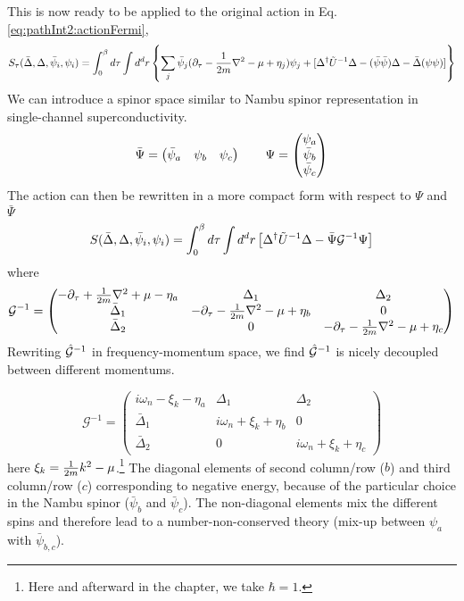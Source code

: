 This is now ready to be applied to the original action in Eq. \ref{eq:pathInt2:actionFermi}, 
\begin{equation}\label{eq:pathInt2:actionMix}
S_{\tau}(\bar\Delta,\Delta,\bar\psi_{i},\psi_{i})=\int^{\beta}_{0}d\tau\int{d^{d}r}\left\{\sum_{j}\bar\psi_{j}(\partial_\tau-\frac{1}{2m}\nabla^{2}-\mu+\eta_{j})\psi_{j}
+[\Delta^{\dagger}\tilde{U}^{-1}\Delta-(\bar\psi\bar\psi)\Delta-\bar\Delta{}(\psi\psi)]\right\}
\end{equation}
We can introduce a spinor space similar to Nambu spinor representation in single-channel superconductivity.  
\begin{equation}
\bar\Psi=\begin{pmatrix}\bar\psi_{a}&\psi_{b}&\psi_{c}\end{pmatrix}\qquad\Psi=\begin{pmatrix}\psi_{a}\\\bar\psi_{b}\\\bar\psi_{c}\end{pmatrix}
\end{equation}
The action can then be rewritten in a more compact form with respect to $\Psi$ and $\bar\Psi$
\begin{equation}\label{eq:pathInt2:actionMixCompact}
S(\bar\Delta,\Delta,\bar\psi_{i},\psi_{i})=\int^{\beta}_{0}d\tau\int{d^{d}r}
	\left[\Delta^{\dagger}\tilde{U}^{-1}\Delta-\bar\Psi\mathcal{G}^{-1}\Psi\right]
\end{equation}
where 
\begin{equation}
\mathcal{G}^{-1}=
\begin{pmatrix}\label{eq:pathInt2:nGDelta}
-\partial_{\tau}+\frac{1}{2m}\nabla^{2}+\mu-\eta_{a}&\Delta_{1}&\Delta_{2}\\
\bar\Delta_{1}&-\partial_{\tau}-\frac{1}{2m}\nabla^{2}-\mu+\eta_{b}&0\\
\bar\Delta_{2}&0&-\partial_{\tau}-\frac{1}{2m}\nabla^{2}-\mu+\eta_{c}
\end{pmatrix}
\end{equation}
Rewriting  $\hat{\mathcal{G}}^{-1}$ in frequency-momentum space, we find $\hat{\mathcal{G}}^{-1}$ is nicely decoupled between different momentums. 

\begin{equation}\label{eq:pathInt2:nGDeltaK}
\mathcal{G}^{-1}=
\begin{pmatrix}
i\omega_{n}-\xi_{k}-\eta_{a}&\Delta_{1}&\Delta_{2}\\
\bar\Delta_{1}&i\omega_{n}+\xi_{k}+\eta_{b}&0\\
\bar\Delta_{2}&0&i\omega_{n}+\xi_{k}+\eta_{c}
\end{pmatrix}
\end{equation}
here $\xi_{k}=\frac{1}{2m}k^{2}-\mu$.\footnote{Here and afterward in the chapter, we take $\hbar=1$.} The diagonal elements of second column/row (${b}$) and third column/row (${c}$) corresponding to negative energy, because of the particular choice in the Nambu spinor ($\bar\psi_{b}$ and $\bar\psi_{c}$).  The non-diagonal elements mix the different spins  and therefore lead to a number-non-conserved theory (mix-up between $\psi_{a}$ with $\bar{\psi}_{b,c}$).  

